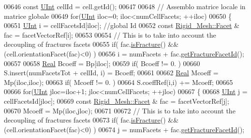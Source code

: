 \begin{DoxyCode}
00646                 \textcolor{keyword}{const} \hyperlink{namespaceFVCode3D_a4bf7e328c75d0fd504050d040ebe9eda}{UInt} cellId         = cell.getId();
00647                 
00648                 \textcolor{comment}{// Assemblo matrice locale in matrice globale}
00649                 \textcolor{keywordflow}{for}(\hyperlink{namespaceFVCode3D_a4bf7e328c75d0fd504050d040ebe9eda}{UInt} iloc=0; iloc<numCellFacets; ++iloc)
00650                 \{
00651             \hyperlink{namespaceFVCode3D_a4bf7e328c75d0fd504050d040ebe9eda}{UInt} i = cellFacetsId[iloc];                                 \textcolor{comment}{//global Id}
00652             \textcolor{keyword}{const} \hyperlink{classFVCode3D_1_1Rigid__Mesh_1_1Facet}{Rigid\_Mesh::Facet} & fac = facetVectorRef[i];     
00653             
00654             \textcolor{comment}{// This is to take into account the decoupling of fractures facets}
00655                         \textcolor{keywordflow}{if}( fac.\hyperlink{classFVCode3D_1_1Rigid__Mesh_1_1Facet_aed3f579d52847e839501f647e90c35ab}{isFracture}() && (cell.orientationFacet(fac)<0) )
00656                                         i = numFacets + fac.\hyperlink{classFVCode3D_1_1Rigid__Mesh_1_1Facet_a08dc369eccd02b29133187cede7511eb}{getFractureFacetId}();
00657 
00658                 \hyperlink{namespaceFVCode3D_a40c1f5588a248569d80aa5f867080e83}{Real} Bcoeff = Bp[iloc];
00659             \textcolor{keywordflow}{if}( Bcoeff != 0. )
00660                                 S.insert(numFacetsTot + cellId, i) = Bcoeff;
00661 
00662             \hyperlink{namespaceFVCode3D_a40c1f5588a248569d80aa5f867080e83}{Real} Mcoeff = Mp(iloc,iloc);
00663             \textcolor{keywordflow}{if}( Mcoeff != 0. )
00664                 S.coeffRef(i,i) += Mcoeff;
00665 
00666             \textcolor{keywordflow}{for}(\hyperlink{namespaceFVCode3D_a4bf7e328c75d0fd504050d040ebe9eda}{UInt} jloc=iloc+1; jloc<numCellFacets; ++jloc)
00667             \{
00668                 \hyperlink{namespaceFVCode3D_a4bf7e328c75d0fd504050d040ebe9eda}{UInt} j = cellFacetsId[jloc];
00669                 \textcolor{keyword}{const} \hyperlink{classFVCode3D_1_1Rigid__Mesh_1_1Facet}{Rigid\_Mesh::Facet} & fac = facetVectorRef[j];
00670                 Mcoeff = Mp(iloc,jloc);
00671                 
00672                 \textcolor{comment}{// This is to take into account the decoupling of fractures facets}
00673                                 \textcolor{keywordflow}{if}( fac.\hyperlink{classFVCode3D_1_1Rigid__Mesh_1_1Facet_aed3f579d52847e839501f647e90c35ab}{isFracture}() && (cell.orientationFacet(fac)<0) )
00674                                         j = numFacets + fac.\hyperlink{classFVCode3D_1_1Rigid__Mesh_1_1Facet_a08dc369eccd02b29133187cede7511eb}{getFractureFacetId}();

\end{DoxyCode}
